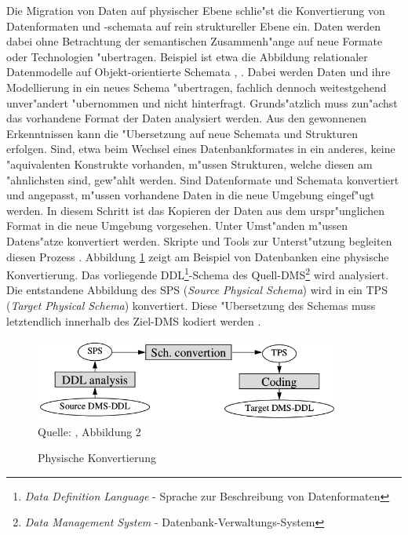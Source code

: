 Die Migration von Daten auf physischer Ebene schlie"st die Konvertierung von Datenformaten und -schemata auf rein struktureller Ebene ein. Daten werden dabei ohne Betrachtung der semantischen Zusammenh"ange auf neue Formate oder Technologien "ubertragen. Beispiel ist etwa die Abbildung relationaler Datenmodelle auf Objekt-orientierte Schemata \citep{alhajj-2001}, \citep{behm-1997}. Dabei werden Daten und ihre Modellierung in ein neues Schema "ubertragen, fachlich dennoch weitestgehend unver"andert "ubernommen und nicht hinterfragt.
\lb
Grunds"atzlich muss zun"achst das vorhandene Format der Daten analysiert werden. Aus den gewonnenen Erkenntnissen kann die "Ubersetzung auf neue Schemata und Strukturen erfolgen. Sind, etwa beim Wechsel eines Datenbankformates in ein anderes, keine "aquivalenten Konstrukte vorhanden, m"ussen Strukturen, welche diesen am "ahnlichsten sind, gew"ahlt werden. 
\lb
Sind Datenformate und Schemata konvertiert und angepasst, m"ussen vorhandene Daten in die neue Umgebung eingef"ugt werden. In diesem Schritt ist das Kopieren der Daten aus dem urspr"unglichen Format in die neue Umgebung vorgesehen. Unter Umst"anden m"ussen Datens"atze konvertiert werden. Skripte und Tools zur Unterst"utzung begleiten diesen Prozess \citep{henrard-2002}.
\lb
Abbildung \ref{pic:conversion_physical} zeigt am Beispiel von Datenbanken eine physische Konvertierung. Das vorliegende DDL\footnote{\textit{Data Definition Language} - Sprache zur Beschreibung von Datenformaten}-Schema des Quell-DMS\footnote{\textit{Data Management System} - Datenbank-Verwaltungs-System} wird analysiert. Die entstandene Abbildung des SPS (\textit{Source Physical Schema}) wird in ein TPS (\textit{Target Physical Schema}) konvertiert. Diese "Ubersetzung des Schemas muss letztendlich innerhalb des Ziel-DMS kodiert werden \citep{henrard-2002}.

\begin{figure}[h!]
	\centering
	\caption{Physische Konvertierung}
	\label{pic:conversion_physical}
	\includegraphics[width=0.9\textwidth]{../images/strategies_fig_02a.png} \\
	\tiny Quelle: \citep{henrard-2002}, Abbildung 2
\end{figure}

